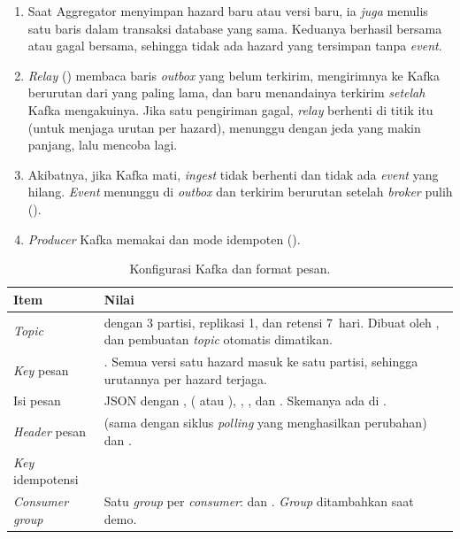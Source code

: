 \begin{enumerate}
 \item Saat Aggregator menyimpan hazard baru atau versi baru, ia \emph{juga} menulis satu baris  dalam transaksi database yang sama. Keduanya berhasil bersama atau gagal bersama, sehingga tidak ada hazard yang tersimpan tanpa \emph{event}.
 \item \emph{Relay} () membaca baris \emph{outbox} yang belum terkirim, mengirimnya ke Kafka berurutan dari yang paling lama, dan baru menandainya terkirim \emph{setelah} Kafka mengakuinya. Jika satu pengiriman gagal, \emph{relay} berhenti di titik itu (untuk menjaga urutan per hazard), menunggu dengan jeda yang makin panjang, lalu mencoba lagi.
 \item Akibatnya, jika Kafka mati, \emph{ingest} tidak berhenti dan tidak ada \emph{event} yang hilang. \emph{Event} menunggu di \emph{outbox} dan terkirim berurutan setelah \emph{broker} pulih ().
 \item \emph{Producer} Kafka memakai  dan mode idempoten ().
\end{enumerate}

\begin{table}[H]
\centering\small
\begin{tabularx}{\textwidth}{@{}L{3.2cm}Y@{}}
\toprule
\textbf{Item} & \textbf{Nilai}\\
\midrule
\emph{Topic} &  dengan 3 partisi, replikasi 1, dan retensi 7~hari. Dibuat oleh , dan pembuatan \emph{topic} otomatis dimatikan.\\
\emph{Key} pesan & . Semua versi satu hazard masuk ke satu partisi, sehingga urutannya per hazard terjaga.\\
Isi pesan & JSON dengan ,  ( atau ), , , dan . Skemanya ada di .\\
\emph{Header} pesan &  (sama dengan siklus \emph{polling} yang menghasilkan perubahan) dan .\\
\emph{Key} idempotensi & \\
\emph{Consumer group} & Satu \emph{group} per \emph{consumer}:  dan . \emph{Group}  ditambahkan saat demo.\\
\bottomrule
\end{tabularx}
\caption{Konfigurasi Kafka dan format pesan.}
\end{table}

